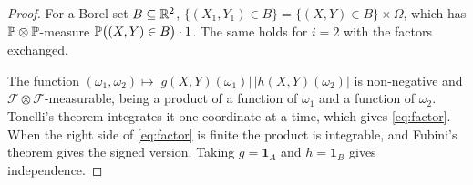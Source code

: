 \documentclass{saim-blog}
\begin{document}
\begin{proof}
For a Borel set $B\subseteq\mathbb{R}^2$, $\{(X_1,Y_1)\in B\}=\{(X,Y)\in B\}\times\Omega$, which has $\mathbb{P}\otimes\mathbb{P}$-measure $\mathbb{P}\big((X,Y)\in B\big)\cdot1$. The same holds for $i=2$ with the factors exchanged.

The function $(\omega_1,\omega_2)\mapsto|g(X,Y)(\omega_1)|\,|h(X,Y)(\omega_2)|$ is non-negative and $\mathcal{F}\otimes\mathcal{F}$-measurable, being a product of a function of $\omega_1$ and a function of $\omega_2$. Tonelli's theorem integrates it one coordinate at a time, which gives \eqref{eq:factor}. When the right side of \eqref{eq:factor} is finite the product is integrable, and Fubini's theorem gives the signed version. Taking $g=\mathbf{1}_A$ and $h=\mathbf{1}_B$ gives independence.
\end{proof}
\end{document}
